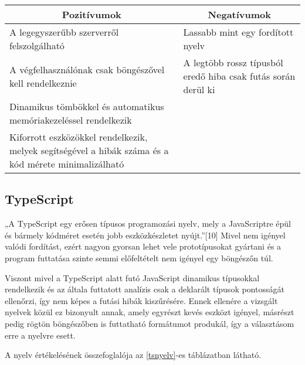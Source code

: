 \begin{center}
  \begin{tabularx}{\textwidth}{X X}
    \hline
    \multicolumn{1}{c}{\bfseries{Pozitívumok}}             & \multicolumn{1}{c}{\bfseries{Negatívumok}}                    \\
    \hline
    A legegyszerűbb szerverről felszolgálható              & Lassabb mint egy fordított nyelv                              \\
    A végfelhasználónak csak böngészővel kell rendelkeznie & A legtöbb rossz típusból eredő hiba csak futás során derül ki \\
    Dinamikus tömbökkel és automatikus memóriakezeléssel rendelkezik                                                       \\
    Kiforrott eszközökkel rendelkezik, melyek segítségével a hibák száma és a kód mérete minimalizálható                   \\
    \hline
  \end{tabularx}
\end{center}

\newpage

\subsection{TypeScript}

„A TypeScript egy erősen típusos programozási nyelv, mely a JavaScriptre épül és bármely kódméret esetén jobb eszközkészletet nyújt.”[10] Mivel nem igényel valódi fordítást, ezért nagyon gyorsan lehet vele prototípusokat gyártani és a program futtatása szinte semmi előfeltételt nem igényel egy böngészőn túl.

Viszont mivel a TypeScript alatt futó JavaScript dinamikus típusokkal rendelkezik és az általa futtatott analízis csak a deklarált típusok pontosságát ellenőrzi, így nem képes a futási hibák kiszűrésére. Ennek ellenére a vizsgált nyelvek közül ez bizonyult annak, amely egyrészt kevés eszközt igényel, másrészt pedig rögtön böngészőben is futtatható formátumot produkál, így a választásom erre a nyelvre esett.

A nyelv értékelésének összefoglalója az \ref{tsnyelv}-es táblázatban látható.

